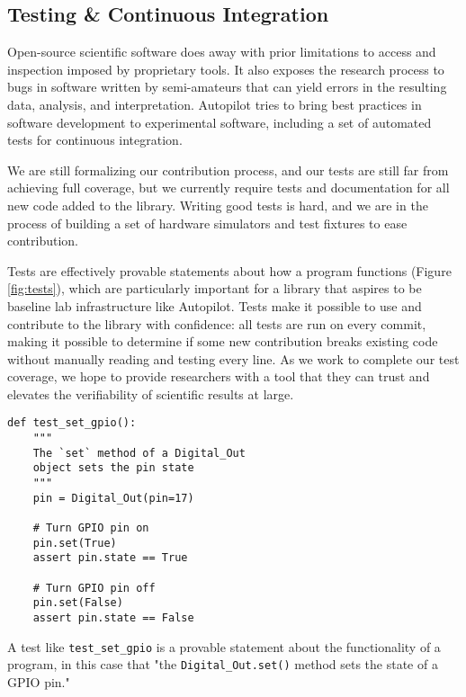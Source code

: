 \subsection{Testing \& Continuous Integration}

Open-source scientific software does away with prior limitations to access and inspection imposed by proprietary tools. It also exposes the research process to bugs in software written by semi-amateurs that can yield errors in the resulting data, analysis, and interpretation\citep{soergelRampantSoftwareErrors2015,eklundClusterFailureWhy2016a,bhandarineupaneCharacterizationLeptazolinesPolar2019,millerScientistNightmareSoftware2006}. Autopilot tries to bring best practices in software development to experimental software, including a set of automated tests for continuous integration. 

We are still formalizing our contribution process, and our tests are still far from achieving full coverage, but we currently require tests and documentation for all new code added to the library. Writing good tests is hard, and we are in the process of building a set of hardware simulators and test fixtures to ease contribution.  

Tests are effectively provable statements about how a program functions (Figure \ref{fig:tests}), which are particularly important for a library that aspires to be baseline lab infrastructure like Autopilot. Tests make it possible to use and contribute to the library with confidence: all tests are run on every commit, making it possible to determine if some new contribution breaks existing code without manually reading and testing every line. As we work to complete our test coverage, we hope to provide researchers with a tool that they can trust and elevates the verifiability of scientific results at large.

\begin{marginfigure}[-0cm]
\begin{verbatim}
def test_set_gpio():
    """
    The `set` method of a Digital_Out
    object sets the pin state
    """
    pin = Digital_Out(pin=17)

    # Turn GPIO pin on
    pin.set(True)
    assert pin.state == True

    # Turn GPIO pin off
    pin.set(False)
    assert pin.state == False
\end{verbatim}
\caption{A test like \texttt{test\_set\_gpio} is a provable statement about the functionality of a program, in this case that "the \texttt{Digital\_Out.set()} method sets the state of a GPIO pin."}
\label{fig:tests}
\end{marginfigure}

